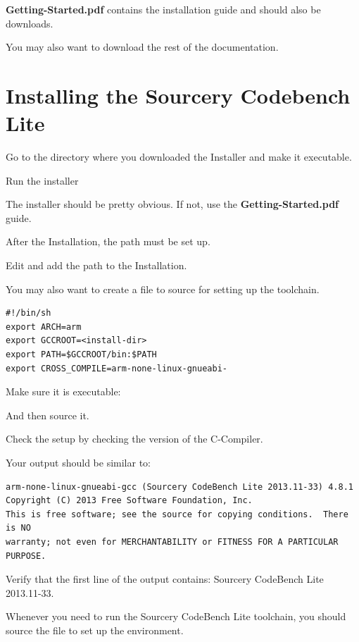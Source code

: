 {\bf Getting-Started.pdf} contains the installation guide and should also be downloads.

You may also want to download the rest of the documentation.

\clearpage
\section{Installing the Sourcery Codebench Lite}

Go to the directory where you downloaded the Installer and make it executable.


Run the installer


The installer should be pretty obvious. If not, use the {\bf Getting-Started.pdf} guide.

After the Installation, the path must be set up.

Edit  and add the path to the Installation.


You may also want to create a file  to source for setting up the toolchain.
\begin{verbatim}
#!/bin/sh
export ARCH=arm
export GCCROOT=<install-dir>
export PATH=$GCCROOT/bin:$PATH
export CROSS_COMPILE=arm-none-linux-gnueabi-
\end{verbatim}

Make sure it is executable:


And then source it.


Check the setup by checking the version of the C-Compiler.


Your output should be similar to:

\begin{verbatim}
arm-none-linux-gnueabi-gcc (Sourcery CodeBench Lite 2013.11-33) 4.8.1
Copyright (C) 2013 Free Software Foundation, Inc.
This is free software; see the source for copying conditions.  There is NO
warranty; not even for MERCHANTABILITY or FITNESS FOR A PARTICULAR PURPOSE.

\end{verbatim}

Verify that the first line of the output contains: Sourcery CodeBench Lite 2013.11-33.

Whenever you need to run the Sourcery CodeBench Lite toolchain, you should source
the  file to set up the environment.






